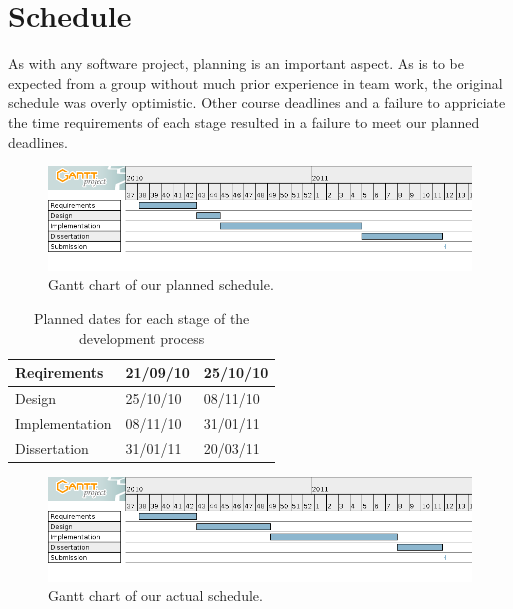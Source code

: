 \label{Organisation}

\section{Schedule}

As with any software project, planning is an important aspect. As is to be expected from a group without much prior experience in team work, the original schedule was overly optimistic. Other course deadlines and a failure to appriciate the time requirements of each stage resulted in a failure to meet our planned deadlines. 

\begin{figure}[!h]
    \begin{center}
        \includegraphics[width=14cm]{appendix/Diagrams/GIMplan.png}
        \caption{Gantt chart of our planned schedule.}
        \label{lockingDia}
    \end{center}
\end{figure}

\begin{table}[!h]
\begin{center}
\caption{Planned dates for each stage of the development process}
\begin{tabular}{ | p{4cm} |p{4cm}  |p{4cm} | } 
    \hline
    Reqirements & 21/09/10 & 25/10/10 \\
    \hline
    Design & 25/10/10 & 08/11/10 \\
    \hline
    Implementation & 08/11/10 & 31/01/11 \\
    \hline
    Dissertation & 31/01/11 & 20/03/11 \\
    \hline
\end{tabular}
\end{center}
\end{table}

\pagebreak

\begin{figure}[!h]
    \begin{center}
        \includegraphics[width=14cm]{appendix/Diagrams/GIMreal.png}
        \caption{Gantt chart of our actual schedule.}
        \label{lockingDia}
    \end{center}
\end{figure}

